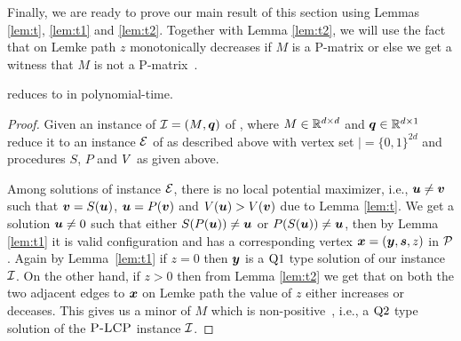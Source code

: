 Finally, we are ready to prove our main result of this section using Lemmas
\ref{lem:t}, \ref{lem:t1} and \ref{lem:t2}. Together with Lemma \ref{lem:t2},
we will use the fact that on Lemke path $z$ monotonically decreases if $M$ is a
P-matrix or else we get a witness that $M$ is not a
P-matrix~\cite{cottle2009linear}. 

\begin{theorem}
\PLCP reduces to \EOPL in polynomial-time. 
\end{theorem}
\begin{proof}
	Given an instance of $\mbox{${\mathcal I}$}=(\mbox{$M$},\mbox{\boldmath $q$})$ of \PLCP, where $M\in \mathbb{R}^{d\times d}$ and $\mbox{\boldmath $q$}\in \mathbb{R}^{d\times 1}$ reduce it to an instance $\mbox{${\mathcal E}$}$ of \EOPL as described above with vertex set $\vert=\{0,1\}^{2d}$ and procedures $S$, $P$ and $\mbox{$V$}$ as given above.

Among solutions of \EOPL instance $\mbox{${\mathcal E}$}$, there is no local potential maximizer,
	i.e., $\mbox{\boldmath $u$}\neq \mbox{\boldmath $v$}$ such that $\mbox{\boldmath $v$}=S(\mbox{\boldmath $u$})$, $\mbox{\boldmath $u$}=P(\mbox{\boldmath $v$})$ and $\mbox{$V$}(\mbox{\boldmath $u$})>\mbox{$V$}(\mbox{\boldmath $v$})$
	due to Lemma \ref{lem:t}. We get a solution $\mbox{\boldmath $u$} \neq 0$ such that either
	$S(P(\mbox{\boldmath $u$}))\neq \mbox{\boldmath $u$}$ or $P(S(\mbox{\boldmath $u$}))\neq \mbox{\boldmath $u$}$, then by Lemma \ref{lem:t1} it is
	valid configuration and has a corresponding vertex $\mbox{\boldmath $x$}=(\mbox{\boldmath $y$},\mbox{\boldmath $s$},z)$ in
	$\mbox{${\mathcal P}$}$. Again by Lemma~\ref{lem:t1} if $z=0$ then $\mbox{\boldmath $y$}$ is a $\mbox{Q1}$ type solution
	of our \PLCP instance $\mbox{${\mathcal I}$}$. On the other hand, if $z>0$ then from Lemma
	\ref{lem:t2} we get that on both the two adjacent edges to $\mbox{\boldmath $x$}$ on Lemke
	path the value of $z$ either increases or deceases. This gives us a minor of $M$
	which is non-positive~\cite{cottle2009linear}, i.e., a $\mbox{Q2}$ type solution of the $\textsc{P-LCP}$ instance $\mbox{${\mathcal I}$}$.
\end{proof}


